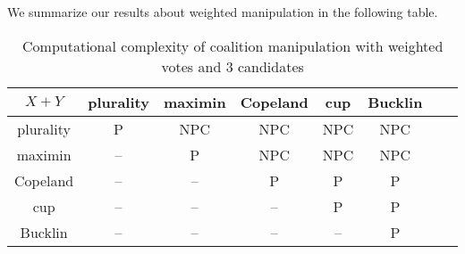 \documentclass{ecai2012}
\newcommand{\winner}[2]{\mbox{$#1 + #2$}}
\begin{document}
We summarize our results about weighted manipulation in
the following table.



\begin{table}
{
  \centering
  \begin{tabular}{|c|c|c|c|c|c|c|c|}
    \hline
$\winner{X}{Y}$ & plurality        &maximin      & Copeland       & cup                & Bucklin \\
      \hline
plurality &P &NPC
                     &NPC
                                                       &  NPC&  NPC\\
      \hline
      maximin &--& P & NPC & NPC    &  NPC       \\
      \hline
     Copeland &--& --& P & P   &      P       \\
      \hline
      cup &--&--&--                           &    P  &  P       \\
      \hline
      Bucklin &--&--&--                          &                       --          &  P    \\
              \hline
  \end{tabular}
  }
  \caption{Computational complexity of coalition
manipulation with weighted votes and 3 candidates}\label{table:weighted}
\end{table}
\end{document}
